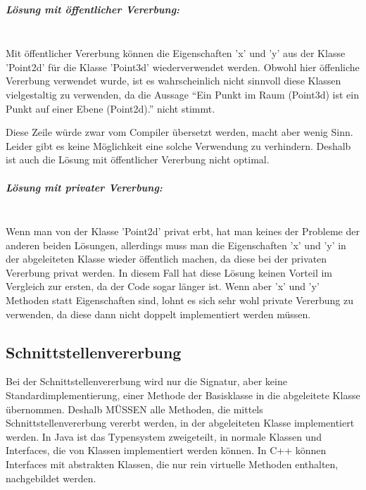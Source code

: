 		\subparagraph*{Lösung mit öffentlicher Vererbung:}\mbox{}\\
		Mit öffentlicher Vererbung können die Eigenschaften 'x' und 'y' aus der Klasse 'Point2d' für die Klasse 'Point3d'
		wiederverwendet werden.
		\UseRawInputEncoding{}
		Obwohl hier öffenliche Vererbung verwendet wurde, ist es wahrscheinlich nicht sinnvoll diese Klassen vielgestaltig
		zu verwenden, da die Aussage ``Ein Punkt im Raum (Point3d) ist ein Punkt auf einer Ebene (Point2d).'' nicht stimmt.
		
		\UseRawInputEncoding{}
		Diese Zeile würde zwar vom Compiler übersetzt werden, macht aber wenig Sinn. Leider gibt es keine Möglichkeit eine
		solche Verwendung zu verhindern. Deshalb ist auch die Lösung mit öffentlicher Vererbung nicht optimal.
		
		\subparagraph*{Lösung mit privater Vererbung:}\mbox{}\\
		\UseRawInputEncoding{}
		Wenn man von der Klasse 'Point2d' privat erbt, hat man keines der Probleme der anderen beiden Lösungen,
		allerdings muss man die Eigenschaften 'x' und 'y' in der abgeleiteten Klasse wieder öffentlich machen, da diese bei
		der privaten Vererbung privat werden. In diesem Fall hat diese Lösung keinen Vorteil im Vergleich zur ersten, da
		der Code sogar länger ist. Wenn aber 'x' und 'y' Methoden statt Eigenschaften sind, lohnt es sich sehr wohl private
		Vererbung zu verwenden, da diese dann nicht doppelt implementiert werden müssen.
	
	\subsection{Schnittstellenvererbung}
		Bei der Schnittstellenvererbung wird nur die Signatur, aber keine Standardimplementierung, einer Methode der
		Basisklasse	in die abgeleitete Klasse übernommen. Deshalb MÜSSEN alle Methoden, die mittels Schnittstellenvererbung
		vererbt werden, in der abgeleiteten Klasse implementiert werden. In Java ist das Typensystem zweigeteilt, in normale
		Klassen und Interfaces, die von Klassen implementiert werden können. In C++ können Interfaces mit abstrakten Klassen,
		die nur rein virtuelle Methoden enthalten, nachgebildet werden.
		
